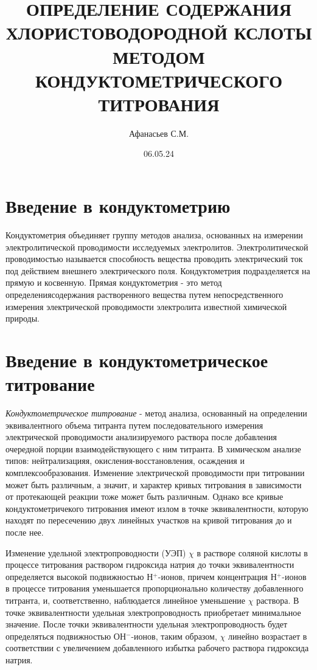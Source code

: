 \documentclass{article}
\title{ОПРЕДЕЛЕНИЕ СОДЕРЖАНИЯ ХЛОРИСТОВОДОРОДНОЙ КСЛОТЫ МЕТОДОМ КОНДУКТОМЕТРИЧЕСКОГО ТИТРОВАНИЯ}
\author{Афанасьев С.М.}
\date{06.05.24}
\begin{document}
   \maketitle
   \tableofcontents
   \newpage
   
   \section*{Введение в кондуктометрию}
    Кондуктометрия объединяет группу методов анализа, основанных на измерении электролитической проводимости
    исследуемых электролитов. Электролитической проводимостью называется способность вещества
    проводить электрический ток под действием внешнего электрического поля.
    \newline Кондуктометрия подразделяется на прямую и косвенную. Прямая кондуктометрия - это
    метод определениясодержания растворенного вещества путем непосредственного измерения электрической проводимости электролита
    известной химической природы.


   \section*{Введение в кондуктометрическое титрование}
   \textit{Кондуктометрическое титрование} - метод анализа, основанный на определении эквивалентного объема титранта путем последовательного
   измерения электрической проводимости анализируемого раствора после добавления
   очередной порции взаимодействующего с ним титранта. В химическом анализе типов: нейтрализацияя,
   окисления-восстановления, осаждения и комплексообразования. Изменение электрической проводимости
   при титровании может быть различным, а значит, и характер кривых титрования в 
   зависимости от протекающей реакции тоже может быть различным. Однако все кривые кондуктометричекого титрования имеют излом
   в точке эквивалентности, которую находят по пересечению двух линейных участков на кривой титрования до и после нее.   
    
   Изменение удельной электропроводности (УЭП) $\chi$ в растворе соляной кислоты в процессе титрования 
   раствором гидроксида натрия до точки эквивалентности определяется высокой подвижностью Н$^+$-ионов, причем концентрация Н$^+$-ионов 
   в процессе титрования уменьшается пропорционально количеству добавленного титранта, и, соответственно, наблюдается линейное уменьшение 
   $\chi$ раствора. В точке эквивалентности удельная электропроводность приобретает минимальное значение. После точки эквивалентности 
   удельная электропроводность будет определяться подвижностью ОН$^-$-ионов, таким образом, $\chi$ линейно возрастает в соответствии 
   с увеличением добавленного избытка рабочего раствора гидроксида натрия.
    \newpage
\end{document}
